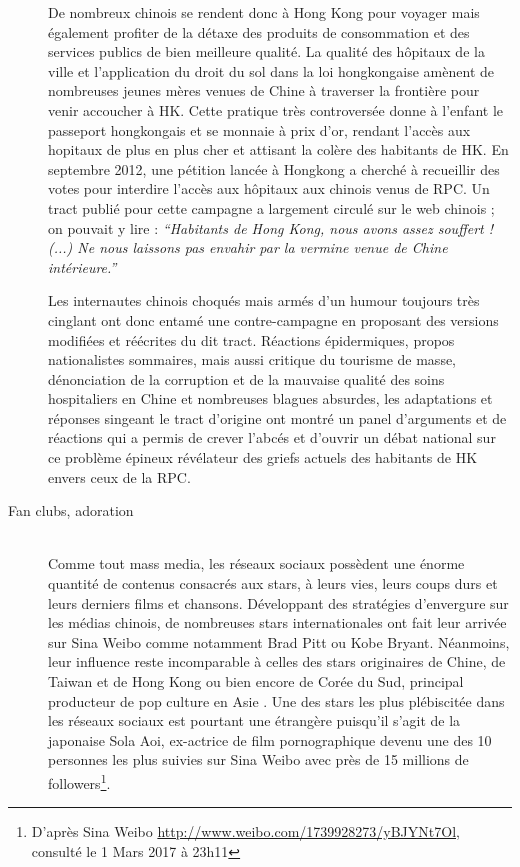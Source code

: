 \begin{description}
De nombreux chinois se rendent donc \`a Hong Kong pour voyager mais \'egalement profiter de la d\'etaxe des produits de consommation et des services publics de bien meilleure qualit\'e. La qualit\'e des h\^opitaux de la ville et l{\textquoteright}application du droit du sol dans la loi hongkongaise am\`enent de nombreuses jeunes m\`eres venues de Chine \`a traverser la fronti\`ere pour venir accoucher \`a HK. Cette pratique tr\`es controvers\'ee donne \`a l{\textquoteright}enfant le passeport hongkongais et se monnaie \`a prix d{\textquoteright}or, rendant l{\textquoteright}acc\`es aux hopitaux de plus en plus cher et attisant la col\`ere des habitants de HK. En septembre 2012, une p\'etition lanc\'ee \`a Hongkong a cherch\'e \`a recueillir des votes pour interdire l{\textquoteright}acc\`es aux h\^opitaux aux chinois venus de RPC. Un tract publi\'e pour cette campagne a largement circul\'e sur le web chinois ; on pouvait y lire :\textit{ {\textquotedblleft}Habitants de Hong Kong, nous avons assez souffert ! (...) Ne nous laissons pas envahir par la vermine venue de Chine int\'erieure.{\textquotedblright}}  

Les internautes chinois choqu\'es mais arm\'es d{\textquoteright}un humour toujours tr\`es cinglant ont donc entam\'e une contre-campagne en proposant des versions modifi\'ees et r\'e\'ecrites du dit tract. R\'eactions \'epidermiques, propos nationalistes sommaires, mais aussi critique du tourisme de masse, d\'enonciation de la corruption et de la mauvaise qualit\'e des soins hospitaliers en Chine et nombreuses blagues absurdes, les adaptations et r\'eponses singeant le tract d{\textquoteright}origine ont montr\'e un panel d{\textquoteright}arguments et de r\'eactions qui a permis de crever l{\textquoteright}abc\'es et d{\textquoteright}ouvrir un d\'ebat national sur ce probl\`eme \'epineux r\'ev\'elateur des griefs actuels des habitants de HK envers ceux de la RPC.  


\item[Fan clubs, adoration]
\hfill \\
Comme tout mass media, les r\'eseaux sociaux poss\`edent une \'enorme quantit\'e de contenus consacr\'es aux stars, \`a leurs vies, leurs coups durs et leurs derniers films et chansons. D\'eveloppant des strat\'egies d{\textquoteright}envergure sur les m\'edias chinois, de nombreuses stars internationales ont fait leur arriv\'ee sur Sina Weibo comme notamment Brad Pitt ou Kobe Bryant. N\'eanmoins, leur influence reste incomparable \`a celles des stars originaires de Chine, de Taiwan et de Hong Kong ou bien encore de Cor\'ee du Sud, principal producteur de pop culture en Asie \citep{Martel2010}. Une des stars les plus pl\'ebiscit\'ee dans les r\'eseaux sociaux est pourtant une \'etrang\`ere puisqu{\textquoteright}il s{\textquoteright}agit de la japonaise Sola Aoi, ex-actrice de film pornographique devenu une des 10 personnes les plus suivies sur Sina Weibo avec pr\`es de 15 millions de followers\footnote{ D{\textquoteright}apr\`es Sina Weibo \url{http://www.weibo.com/1739928273/yBJYNt7Ol,} consult\'e le 1 Mars 2017 \`a 23h11}. 


\end{description}
